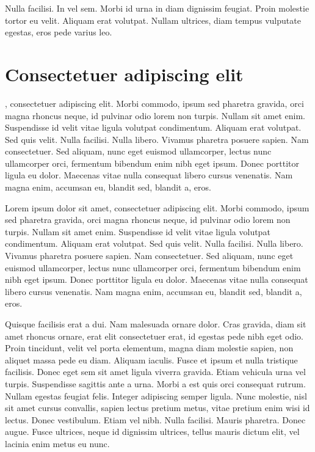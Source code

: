 \begin{savequote}[75mm] Nulla facilisi. In vel sem. Morbi id urna in diam
	dignissim feugiat. Proin molestie tortor eu velit. Aliquam erat
	volutpat. Nullam ultrices, diam tempus vulputate egestas, eros pede
	varius leo.   \end{savequote}

\chapter{Consectetuer adipiscing elit}

, consectetuer adipiscing elit. Morbi
commodo, ipsum sed pharetra gravida, orci magna rhoncus neque, id pulvinar odio
lorem non turpis. Nullam sit amet enim. Suspendisse id velit vitae ligula
volutpat condimentum. Aliquam erat volutpat. Sed quis velit. Nulla facilisi.
Nulla libero. Vivamus pharetra posuere sapien. Nam consectetuer. Sed aliquam,
nunc eget euismod ullamcorper, lectus nunc ullamcorper orci, fermentum bibendum
enim nibh eget ipsum. Donec porttitor ligula eu dolor. Maecenas vitae nulla
consequat libero cursus venenatis. Nam magna enim, accumsan eu, blandit sed,
blandit a, eros.

Lorem ipsum dolor sit amet, consectetuer adipiscing elit. Morbi commodo, ipsum
sed pharetra gravida, orci magna rhoncus neque, id pulvinar odio lorem non
turpis. Nullam sit amet enim. Suspendisse id velit vitae ligula volutpat
condimentum. Aliquam erat volutpat. Sed quis velit. Nulla facilisi. Nulla
libero. Vivamus pharetra posuere sapien. Nam consectetuer. Sed aliquam, nunc
eget euismod ullamcorper, lectus nunc ullamcorper orci, fermentum bibendum enim
nibh eget ipsum. Donec porttitor ligula eu dolor. Maecenas vitae nulla
consequat libero cursus venenatis. Nam magna enim, accumsan eu, blandit sed,
blandit a, eros.

Quisque facilisis erat a dui. Nam malesuada ornare dolor. Cras gravida, diam
sit amet rhoncus ornare, erat elit consectetuer erat, id egestas pede nibh eget
odio. Proin tincidunt, velit vel porta elementum, magna diam molestie sapien,
non aliquet massa pede eu diam. Aliquam iaculis. Fusce et ipsum et nulla
tristique facilisis. Donec eget sem sit amet ligula viverra gravida. Etiam
vehicula urna vel turpis. Suspendisse sagittis ante a urna. Morbi a est quis
orci consequat rutrum. Nullam egestas feugiat felis. Integer adipiscing semper
ligula. Nunc molestie, nisl sit amet cursus convallis, sapien lectus pretium
metus, vitae pretium enim wisi id lectus. Donec vestibulum. Etiam vel nibh.
Nulla facilisi. Mauris pharetra. Donec augue. Fusce ultrices, neque id
dignissim ultrices, tellus mauris dictum elit, vel lacinia enim metus eu nunc.

